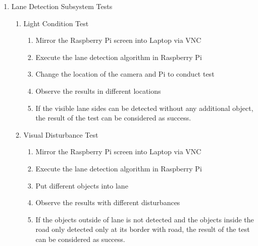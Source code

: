 \documentclass[a4paper,12pt]{article}
\begin{document}
\begin{enumerate}


\item {Lane Detection Subsystem Tests}	

\begin{enumerate}

\item{Light Condition Test}

\begin{enumerate}

\item Mirror the Raspberry Pi screen into Laptop via VNC  

\item Execute the lane detection algorithm in Raspberry Pi 

\item Change the location of the camera and Pi to conduct test 

\item Observe the results in different locations   

\item If the visible lane sides can be detected without any additional object, the result of the test can be considered as success. 

\end{enumerate}

\item{Visual Disturbance Test}

\begin{enumerate}

\item Mirror the Raspberry Pi screen into Laptop via VNC   

\item Execute the lane detection algorithm in Raspberry Pi  

\item Put different objects into lane  

\item Observe the results with different disturbances 

\item If the objects outside of lane is not detected and the objects inside the road only detected only at its border with road, the result of the test can be considered as success.  

\end{enumerate}

\end{enumerate}



\end{enumerate}
\end{document}

